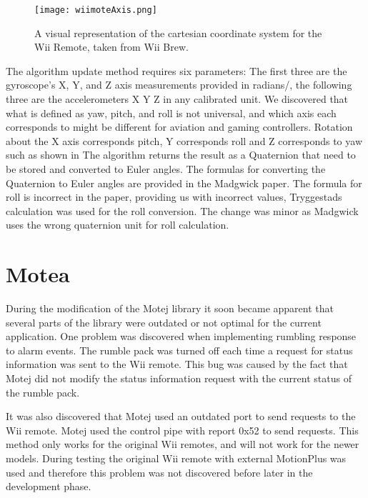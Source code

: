 \begin{figure}[h!]
  \centering
    \texttt{[image: wiimoteAxis.png]}
    \caption{\footnotesize A visual representation of the cartesian coordinate system for the Wii Remote, taken from Wii Brew\cite{wiiBrew}.}
\end{figure}


The algorithm update method requires six parameters: The first three are the gyroscope's X, Y, and Z axis measurements provided in radians/, the following three are the accelerometers X Y Z in any calibrated unit. We discovered that what is defined as yaw, pitch, and roll is not universal, and which axis each corresponds to might be different for aviation and gaming controllers. Rotation about the X axis corresponds pitch, Y corresponds roll and Z corresponds to yaw such as shown in %
The algorithm returns the result as a Quaternion that need to be stored and converted to Euler angles. The formulas for converting the Quaternion to Euler angles are provided in the Madgwick paper. The formula for roll is incorrect in the paper, providing us with incorrect values, Tryggestads calculation was used for the roll conversion. The change was minor as Madgwick uses the wrong quaternion unit for roll calculation.


\section{Motea}
\label{sec:motea}
During the modification of the Motej library it soon became apparent that several parts of the library were outdated or not optimal for the current application. One problem was discovered when implementing rumbling response to alarm events. The rumble pack was turned off each time a request for status information was sent to the Wii remote. This bug was caused by the fact that Motej did not modify the status information request with the current status of the rumble pack.

It was also discovered that Motej used an outdated port to send requests to the Wii remote. Motej used the control pipe with report 0x52 to send requests. This method only works for the original Wii remotes, and will not work for the newer models. During testing the original Wii remote with external MotionPlus was used and therefore this problem was not discovered before later in the development phase.

